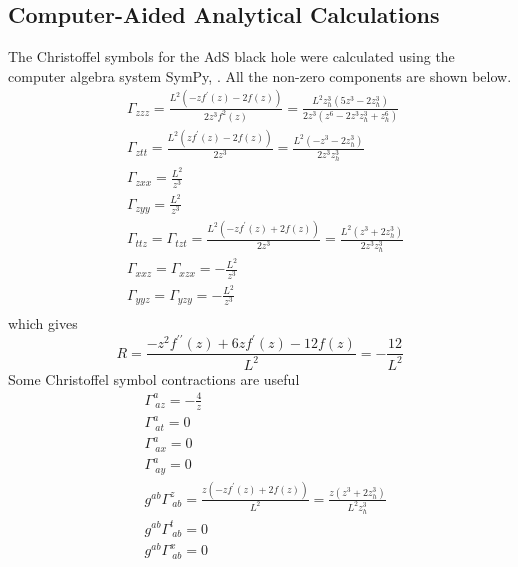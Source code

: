 \documentclass[12pt]{report}
\newcommand{\sympy}{SymPy}
\begin{document}
\begin{appendices}
\chapter{Computer-Aided Analytical Calculations\label{CAS}}
The Christoffel symbols for the AdS black hole were calculated using the computer algebra system \sympy, \cite{sympy}. All the non-zero components are shown below.
\begin{equation}
\begin{split}
&
\Gamma_{zzz}=\frac{L^{2} \left(- z f^\prime\left(z\right) - 2 f\left(z\right)\right)}{2 z^{3} f^{2}\left(z\right)}=\frac{L^{2} z_h^{3} \left(5 z^{3} - 2 z_h^{3}\right)}{2 z^{3} \left(z^{6} - 2 z^{3} z_h^{3} + z_h^{6}\right)}\\
&
\Gamma_{ztt}=\frac{L^{2} \left(z f^\prime\left(z\right) - 2 f\left(z\right)\right)}{2 z^{3}}=\frac{L^{2} \left(- z^{3} - 2 z_h^{3}\right)}{2 z^{3} z_h^{3}}\\
&
\Gamma_{zxx}=\frac{L^{2}}{z^{3}}\\
&
\Gamma_{zyy}=\frac{L^{2}}{z^{3}}\\
&
\Gamma_{ttz}=
\Gamma_{tzt}=\frac{L^{2} \left(- z f^\prime\left(z\right) + 2 f\left(z\right)\right)}{2 z^{3}}=\frac{L^{2} \left(z^{3} + 2 z_h^{3}\right)}{2 z^{3} z_h^{3}}\\
&
\Gamma_{xxz}=
\Gamma_{xzx}=- \frac{L^{2}}{z^{3}}\\
&
\Gamma_{yyz}=
\Gamma_{yzy}=- \frac{L^{2}}{z^{3}}\\
\end{split}\label{CS}
\end{equation}
which gives
\begin{equation}
 R=\frac{- z^{2} f^{\prime\prime}\left(z\right) + 6 z f^\prime\left(z\right) - 12 f\left(z\right)}{L^{2}}=- \frac{12}{L^{2}}
\end{equation}
Some Christoffel symbol contractions are useful
\begin{equation}
\begin{split}
&\Gamma^a_{\ az}=- \frac{4}{z}\\
&\Gamma^a_{\ at}=0\\
&\Gamma^a_{\ ax}=0\\
&\Gamma^a_{\ ay}=0\\
&g^{ab}\Gamma^z_{\ ab}=\frac{z \left(- z f^\prime\left(z\right) + 2 f\left(z\right)\right)}{L^{2}}=\frac{z \left(z^{3} + 2 z_h^{3}\right)}{L^{2} z_h^{3}}\\
&g^{ab}\Gamma^t_{\ ab}=0\\
&g^{ab}\Gamma^x_{\ ab}=0\\

\end{split}
\end{equation}
\end{appendices}
\end{document}
